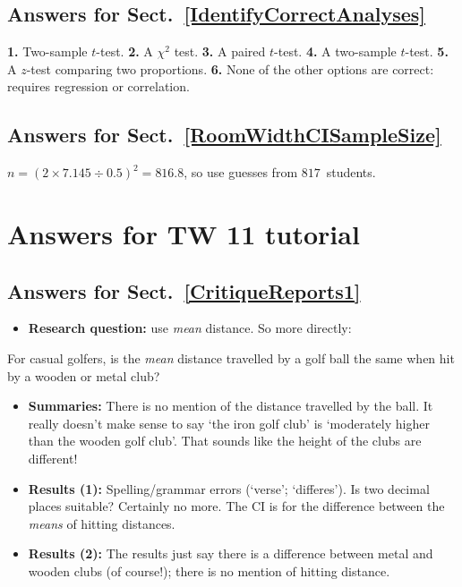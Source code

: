 \documentclass[
  11pt,
  a4paper,
  krantz2]{krantz}
\makeatletter
\providecommand{\tightlist}{%
  \setlength{\itemsep}{0pt}\setlength{\parskip}{0pt}}
\renewenvironment{quote}%
{\begin{kframe}}
{\end{kframe}}
\newenvironment{kframe}{%
\medskip{}
\setlength{\fboxsep}{.8em}
 \def\at@end@of@kframe{}%
 \ifinner\ifhmode%
  \def\at@end@of@kframe{\end{minipage}}%
  \begin{minipage}{\columnwidth}%
 \fi\fi%
 \def\FrameCommand##1{\hskip\@totalleftmargin \hskip-\fboxsep
 \colorbox{shadecolor}{##1}\hskip-\fboxsep
     \hskip-\linewidth \hskip-\@totalleftmargin \hskip\columnwidth}%
 \MakeFramed {\advance\hsize-\width
   \@totalleftmargin\z@ \linewidth\hsize
   \@setminipage}}%
 {\par\unskip\endMakeFramed%
 \at@end@of@kframe}
\renewenvironment{quote}
               {\list{}{\vspace{-0.5em}\begin{kframe}\small%
                        \rightmargin   \leftmargin
                        \parsep        \z@ \@plus\p@}%
                \item\relax}
               {\end{kframe}\endlist}
\makeatother
\begin{document}
\begin{footnotesize}
\subsection*{Answers for Sect.~\ref{IdentifyCorrectAnalyses}}\label{answers-for-sect.-refidentifycorrectanalyses}

\textbf{1.} Two-sample \(t\)-test.
\textbf{2.} A \(\chi^2\) test.
\textbf{3.} A paired \(t\)-test.
\textbf{4.} A two-sample \(t\)-test.
\textbf{5.} A \(z\)-test comparing two proportions.
\textbf{6.} None of the other options are correct: requires regression or correlation.

\subsection*{Answers for Sect.~\ref{RoomWidthCISampleSize}}\label{answers-for-sect.-refroomwidthcisamplesize}

\(n = (2\times 7.145\div 0.5)^2 = 816.8\), so use guesses from \(817\)~students.

\section{Answers for TW 11 tutorial}\label{Lecture11Answers}

\subsection*{Answers for Sect.~\ref{CritiqueReports1}}\label{answers-for-sect.-refcritiquereports1}

\begin{itemize}
\tightlist
\item
  \textbf{Research question:} use \emph{mean} distance.
  So more directly:
\end{itemize}

\begin{quote}
For casual golfers, is the \emph{mean} distance travelled by a golf ball the same when hit by a wooden or metal club?
\end{quote}

\begin{itemize}
\tightlist
\item
  \textbf{Summaries:}
  There is no mention of the distance travelled by the ball.
  It really doesn't make sense to say `the iron golf club' is `moderately higher than the wooden golf club'.
  That sounds like the height of the clubs are different!
\item
  \textbf{Results (1):}
  Spelling/grammar errors (`verse'; `differes').
  Is two decimal places suitable? Certainly no more.
  The CI is for the difference between the \emph{means} of hitting distances.
\item
  \textbf{Results (2):}
  The results just say there is a difference between metal and wooden clubs (of course!); there is no mention of hitting distance.
\end{itemize}


\end{footnotesize}
\end{document}
